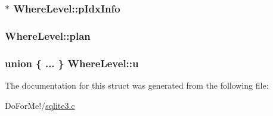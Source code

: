\hypertarget{struct_where_level_a9d8132e8f26189b92e90899094858345}{
\subsubsection[{p\-Idx\-Info}]{$\ast$ Where\-Level\-::p\-Idx\-Info}}\label{struct_where_level_a9d8132e8f26189b92e90899094858345}
\hypertarget{struct_where_level_a4567b2ab4792fea7a1bc4e9baa494394}{
\subsubsection[{plan}]{ Where\-Level\-::plan}}\label{struct_where_level_a4567b2ab4792fea7a1bc4e9baa494394}
\hypertarget{struct_where_level_aa3f96f45191d7953027d8bb53bbe2423}{
\subsubsection[{u}]{\setlength{\rightskip}{0pt plus 5cm}union \{ ... \}   Where\-Level\-::u}}\label{struct_where_level_aa3f96f45191d7953027d8bb53bbe2423}


The documentation for this struct was generated from the following file\-:\begin{DoxyCompactItemize}
\item 
Do\-For\-Me!/\hyperlink{sqlite3_8c}{sqlite3.\-c}\end{DoxyCompactItemize}
